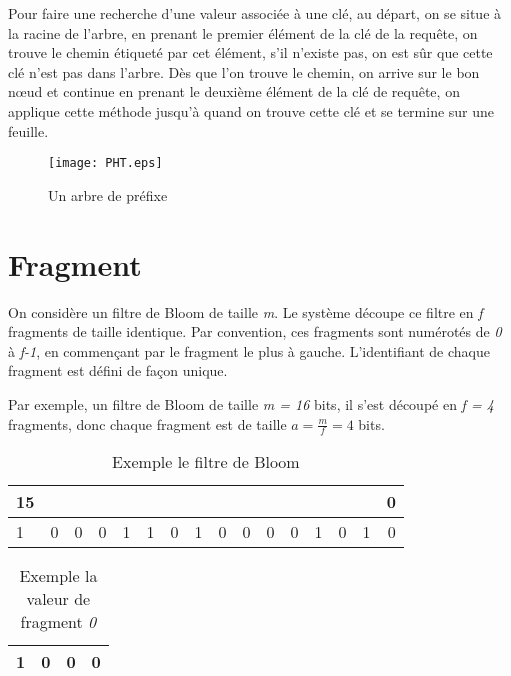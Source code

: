 \documentclass[a4paper,11pt]{report}
\begin{document}
	Pour faire une recherche d'une valeur associée à une clé, au départ, on se situe à la racine de l'arbre, en prenant le premier élément de la clé de la requête, on trouve le chemin étiqueté par cet élément, s'il n'existe pas, on est sûr que cette clé n'est pas dans l'arbre. Dès que l'on trouve le chemin, on arrive sur le bon nœud et continue en prenant le deuxième élément de la clé de requête, on applique cette méthode jusqu'à quand on trouve cette clé et se termine sur une feuille.
	
	\begin{figure}[!htbp]
	\centering
	\texttt{[image: PHT.eps]}
	\caption{Un arbre de préfixe}
	\label{PHT}
	\end{figure}	

\newpage

\section{Fragment}
	On considère un filtre de Bloom de taille \textit{m}. Le système découpe ce filtre en \textit{f} fragments de taille identique. Par convention, ces fragments sont numérotés de \textit{0} à \textit{f-1}, en commençant par le fragment le plus à gauche. L'identifiant de chaque fragment est défini de façon unique.
	
		Par exemple, un filtre de Bloom de taille \textit{m = 16} bits, il s'est découpé en \textit{f = 4} fragments, donc chaque fragment est de taille $a = \frac{m}{f} = 4$ bits.

	\begin{table}[!h]
		\centering		
		\begin{tabular}{|l|*{14}{c|}r|}
		\multicolumn{1}{c}{{\scriptsize 15}} &\multicolumn{1}{c}{}&\multicolumn{1}{c}{}&\multicolumn{1}{c}{}&
		\multicolumn{1}{c}{}&\multicolumn{1}{c}{}&\multicolumn{1}{c}{}&\multicolumn{1}{c}{}&
		\multicolumn{1}{c}{}&\multicolumn{1}{c}{}&\multicolumn{1}{c}{}&\multicolumn{1}{c}{}&
		\multicolumn{1}{c}{}&\multicolumn{1}{c}{}&\multicolumn{1}{c}{}&\multicolumn{1}{c}{{\scriptsize 0}}\\
		\hline
			1 & 0 & 0 & \multicolumn{1}{c||}{0} & 
			1 & 1 & 0 & \multicolumn{1}{c||}{1} & 
			0 & 0 & 0 & \multicolumn{1}{c||}{0} & 
			1 & 0 & 1 & 0 \\
		\hline
		\end{tabular}
		\caption{Exemple le filtre de Bloom}
		\label{fragment/filtredeBloom}
	\end{table}

	\begin{table}[!h]
		\centering		
		\begin{tabular}{|l|*{2}{c|}r|}
		\hline
			1 & 0 & 0 & 0 \\
		\hline
		\end{tabular}
		\caption{Exemple la valeur de fragment \textit{0}}
		\label{fragement/exemple1}
	\end{table}
\end{document}
